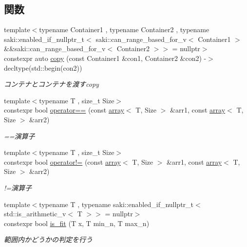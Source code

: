 \subsection*{関数}
\begin{DoxyCompactItemize}
\item 
{\footnotesize template$<$typename Container1 , typename Container2 , typename saki\+::enabled\+\_\+if\+\_\+nullptr\+\_\+t$<$ saki\+::can\+\_\+range\+\_\+based\+\_\+for\+\_\+v$<$ Container1 $>$ \&\&saki\+::can\+\_\+range\+\_\+based\+\_\+for\+\_\+v$<$ Container2 $>$$>$  = nullptr$>$ }\\constexpr auto \mbox{\hyperlink{namespacesaki_a3a9c67bf73207dfb61db4cd53ee35863}{copy}} (const Container1 \&con1, Container2 \&con2) -\/$>$ decltype(std\+::begin(con2))
\begin{DoxyCompactList}\small\item\em コンテナとコンテナを渡すcopy \end{DoxyCompactList}\item 
{\footnotesize template$<$typename T , size\+\_\+t Size$>$ }\\constexpr bool \mbox{\hyperlink{namespacesaki_a5ce8a66ed6ece15fa9ddeaec2746374d}{operator==}} (const \mbox{\hyperlink{classsaki_1_1array}{array}}$<$ T, Size $>$ \&arr1, const \mbox{\hyperlink{classsaki_1_1array}{array}}$<$ T, Size $>$ \&arr2)
\begin{DoxyCompactList}\small\item\em ==演算子 \end{DoxyCompactList}\item 
{\footnotesize template$<$typename T , size\+\_\+t Size$>$ }\\constexpr bool \mbox{\hyperlink{namespacesaki_aed742cc915a830fea9f4993c0a031c45}{operator!=}} (const \mbox{\hyperlink{classsaki_1_1array}{array}}$<$ T, Size $>$ \&arr1, const \mbox{\hyperlink{classsaki_1_1array}{array}}$<$ T, Size $>$ \&arr2)
\begin{DoxyCompactList}\small\item\em !=演算子 \end{DoxyCompactList}\item 
{\footnotesize template$<$typename T , typename saki\+::enabled\+\_\+if\+\_\+nullptr\+\_\+t$<$ std\+::is\+\_\+arithmetic\+\_\+v$<$ T $>$$>$  = nullptr$>$ }\\constexpr bool \mbox{\hyperlink{namespacesaki_a419ec46a4eaf271747846aaa8e7df594}{is\+\_\+fit}} (T x, T min\+\_\+n, T max\+\_\+n)
\begin{DoxyCompactList}\small\item\em 範囲内かどうかの判定を行う \end{DoxyCompactList}\item 

\end{DoxyCompactItemize}
